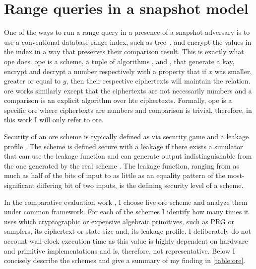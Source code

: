 \chapter{Range queries in a snapshot model}\label{section:range-queries-snapshot}
\thispagestyle{myheadings}

	One of the ways to run a range query in a presence of a snapshot adversary is to use a conventional database range index, such as \BPlus{} tree~\cite{b-tree}, and encrypt the values in the index in a way that preserves their comparison result.
	This is exactly what \gls{ope} does.
	\gls{ope} is a scheme, a tuple of algorithms ,  and , that generate a kay, encrypt and decrypt a number respectively with a property that if $x$ was smaller, greater or equal to $y$, then their respective ciphertexts will maintain the relation.
	\gls{ore} works similarly except that the ciphertexts are not necessarily numbers and a comparison is an explicit algorithm  over hte ciphertexts.
	Formally, \gls{ope} is a specific \gls{ore} where ciphertexts are numbers and comparison is trivial, therefore, in this work I will only refer to \gls{ore}.

	Security of an \gls{ore} scheme is typically defined as via security game and a leakage profile \cite{practical-ore}.
	The scheme is defined secure with a leakage \leakage{} if there exists a simulator that can use the leakage function and can generate output indistinguishable from the one generated by the real scheme \cite{ore-benchmark-17}.
	The leakage function, ranging from as much as half of the bits of input to as little as an equality pattern of the most-significant differing bit of two inputs, is the defining security level of a scheme.

	In the comparative evaluation work \cite{ore-benchmark-17}, I choose five \gls{ore} scheme and analyze them under common framework.
	For each of the schemes I identify how many times it uses which cryptographic or expensive algebraic primitives, such as PRG or samplers, its ciphertext or state size and, its leakage profile.
	I deliberately do not account wall-clock execution time as this value is highly dependent on hardware and primitive implementations and is, therefore, not representative.
	Below I concisely describe the schemes and give a summary of my finding in \cref{table:ore}.

	

